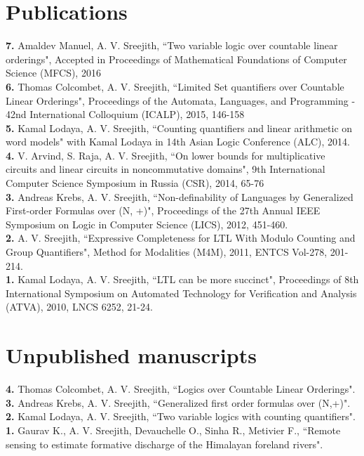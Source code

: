 \documentclass[margin]{res}
\begin{document}
\begin{resume}
\section{Publications}
{\bf 7.} Amaldev Manuel, A. V. Sreejith, ``Two variable logic over countable linear orderings", Accepted in Proceedings of Mathematical Foundations of Computer Science (MFCS), 2016 \\
{\bf 6.} Thomas Colcombet, A. V. Sreejith, ``Limited Set quantifiers over Countable Linear Orderings", Proceedings of the Automata, Languages, and Programming - 42nd International Colloquium (ICALP), 2015, 146-158 \\
{\bf 5.} Kamal Lodaya, A. V. Sreejith, ``Counting quantifiers and linear arithmetic on word models" with Kamal Lodaya in 14th Asian Logic Conference (ALC), 2014. \\
{\bf 4.} V. Arvind, S. Raja, A. V. Sreejith, ``On lower bounds for multiplicative circuits and linear circuits in noncommutative domains", 9th International Computer Science Symposium in Russia (CSR), 2014, 65-76\\
{\bf 3.} Andreas Krebs, A. V. Sreejith, ``Non-definability of Languages by Generalized First-order Formulas over (N, +)", Proceedings of the 27th Annual IEEE Symposium on Logic in Computer Science (LICS), 2012, 451-460.\\
{\bf 2.} A. V. Sreejith, ``Expressive Completeness for LTL With Modulo Counting and Group Quantifiers", Method for Modalities (M4M), 2011, ENTCS Vol-278, 201-214.\\
{\bf 1.} Kamal Lodaya, A. V. Sreejith, ``LTL can be more succinct", Proceedings of 8th International Symposium on Automated Technology for Verification and Analysis (ATVA), 2010, LNCS 6252, 21-24. \\

\section{Unpublished manuscripts}
{\bf 4.} Thomas Colcombet, A. V. Sreejith, ``Logics over Countable Linear Orderings". \\
{\bf 3.} Andreas Krebs, A. V. Sreejith, ``Generalized first order formulas over (N,+)". \\
{\bf 2.} Kamal Lodaya, A. V. Sreejith, ``Two variable logics with counting quantifiers". \\
{\bf 1.} Gaurav K., A. V. Sreejith, Devauchelle O., Sinha R., Metivier F., ``Remote sensing to estimate formative discharge of the Himalayan foreland rivers".



\end{resume}
\end{document}
